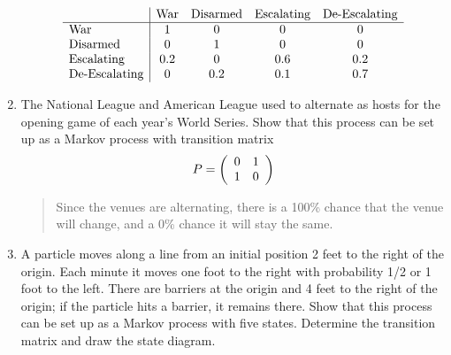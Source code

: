 \documentclass{hw}
\begin{document}
\begin{enumerate}
\[
\begin{array}{l | c c c c}
& \text{War} & \text{Disarmed} & \text{Escalating} & \text{De-Escalating}\\
\hline
\text{War}              & 1 & 0 & 0 & 0\\
\text{Disarmed}         & 0 & 1 & 0 & 0\\
\text{Escalating}       & 0.2 & 0 & 0.6 & 0.2\\
\text{De-Escalating}    & 0 & 0.2 & 0.1 & 0.7
\end{array}
\]
\begin{center}
\end{center}

\item The National League and American League used to alternate as hosts for the opening game of
each year’s World Series. Show that this process can be set up as a Markov process with transition
matrix
\[
P=
\left(
\begin{array}{c c}
0 & 1\\
1 & 0
\end{array}
\right)
\]
\begin{quote}
Since the venues are alternating, there is a 100\% chance that the venue will change, and a 0\%
chance it will stay the same.
\end{quote}

\item A particle moves along a line from an initial position 2 feet to the right of the origin.
Each minute it moves one foot to the right with probability 1/2 or 1 foot to the left. There
are barriers at the origin and 4 feet to the right of the origin; if the particle hits a barrier,
it remains there. Show that this process can be set up as a Markov process with five states.
Determine the transition matrix and draw the state diagram.


\end{enumerate}
\end{document}
